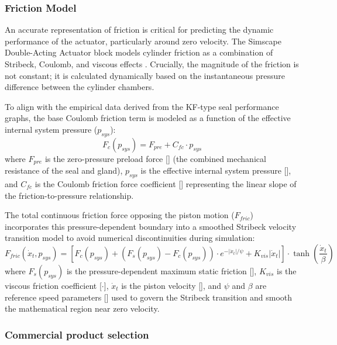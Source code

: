 \documentclass[
bindingoffset=5mm,  %
footnoteindent=3mm, %
hyphenation=true    %
]{src/wut-thesis}
\begin{document}
	\subsubsection{Friction Model}
	An accurate representation of friction is critical for predicting the dynamic performance of the actuator, particularly around zero velocity. The Simscape Double-Acting Actuator block models cylinder friction as a combination of Stribeck, Coulomb, and viscous effects \cite{mw:actuator}. Crucially, the magnitude of the friction is not constant; it is calculated dynamically based on the instantaneous pressure difference between the cylinder chambers.
	
	To align with the empirical data derived from the KF-type seal performance graphs, the base Coulomb friction term is modeled as a function of the effective internal system pressure ($p_{sys}$):
	\begin{equation}
		F_c(p_{sys}) = F_{pre} + C_{fc} \cdot p_{sys}
	\end{equation}
	where $F_{pre}$ is the zero-pressure preload force [] (the combined mechanical resistance of the seal and gland), $p_{sys}$ is the effective internal system pressure [], and $C_{fc}$ is the Coulomb friction force coefficient [] representing the linear slope of the friction-to-pressure relationship.
	
	The total continuous friction force opposing the piston motion ($F_{fric}$) incorporates this pressure-dependent boundary into a smoothed Stribeck velocity transition model to avoid numerical discontinuities during simulation:
	\begin{equation}
		F_{fric}(\dot{x}_{t}, p_{sys}) = \left[ F_c(p_{sys}) + (F_s(p_{sys}) - F_c(p_{sys})) \cdot e^{-|\dot{x}_{t}|/\psi} + K_{vis}|\dot{x}_{t}| \right] \cdot \tanh\left(\frac{\dot{x}_{t}}{\beta}\right)
	\end{equation}
	where $F_s(p_{sys})$ is the pressure-dependent maximum static friction [], $K_{vis}$ is the viscous friction coefficient [$\cdot$], $\dot{x}_{t}$ is the piston velocity [], and $\psi$ and $\beta$ are reference speed parameters [] used to govern the Stribeck transition and smooth the mathematical region near zero velocity.
	
	\subsubsection{Commercial product selection}
	
\end{document}
